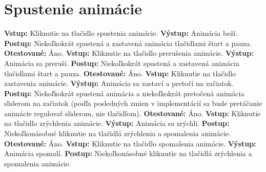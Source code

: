 \documentclass[12pt,a4paper]{report}
\begin{document}
\section[Spustenie animácie]{\rmfamily\bfseries
	Spustenie animácie}
\begin{flushleft}
	\textbf{Vstup:} Kliknutie na tlačidlo spustenia animácie.\linebreak
	\textbf{Výstup:} Animácia beží.\linebreak
	\textbf{Postup:} Niekoľkokrát spustená a zastavená animácia tlačidlami štart a pauza. \linebreak
	\textbf{Otestované:} Áno.\linebreak
	\linebreak
	\textbf{Vstup:} Kliknutie na tlačidlo prerušenia animácie.\linebreak
	\textbf{Výstup:} Animácia sa preruší.\linebreak
	\textbf{Postup:} Niekoľkokrát spustená a zastavená animácia tlačidlami štart a pauza. \linebreak
	\textbf{Otestované:} Áno.\linebreak
	\linebreak
	\textbf{Vstup:} Kliknutie na tlačidlo zastavenia animácie.\linebreak
	\textbf{Výstup:} Animácia sa zastaví a pretočí na začiatok.\linebreak
	\textbf{Postup:} Niekoľkokrát spustená animácia a niekoľkokrát pretočená animácia sliderom na začiatok (podľa posledných zmien v implementácií sa bude pretáčanie animácie regulovať sliderom, nie tlačidlom). \linebreak
	\textbf{Otestované:} Áno.\linebreak
	\linebreak
	\textbf{Vstup:} Kliknutie na tlačidlo zrýchlenia animácie.\linebreak
	\textbf{Výstup:} Animácia sa zrýchli.\linebreak
	\textbf{Postup:} Niekoľkonásobné kliknutie na tlačidlá zrýchlenia a spomalenia animácie. \linebreak
	\textbf{Otestované:} Áno.\linebreak
	\linebreak
	\textbf{Vstup:} Kliknutie na tlačidlo spomalenia animácie.\linebreak
	\textbf{Výstup:} Animácia spomalí.\linebreak
	\textbf{Postup:} Niekoľkonásobné kliknutie na tlačidlá zrýchlenia a spomalenia animácie. \linebreak

\end{flushleft}
\end{document}
